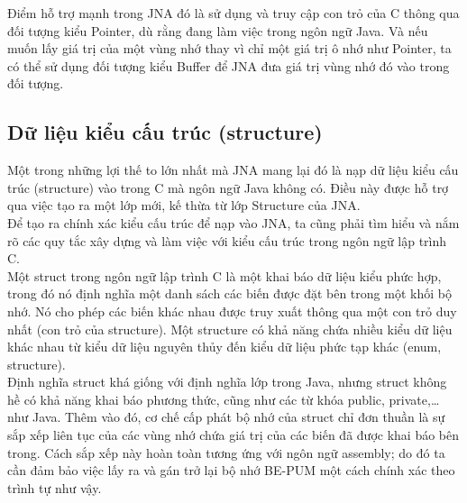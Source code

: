 Điểm hỗ trợ mạnh trong JNA đó là sử dụng và truy cập con trỏ của C thông qua đối tượng kiểu Pointer, dù rằng đang làm việc trong ngôn ngữ Java. Và nếu muốn lấy giá trị của một vùng nhớ thay vì chỉ một giá trị ô nhớ như Pointer, ta có thể sử dụng đối tượng kiểu Buffer để JNA đưa giá trị vùng nhớ đó vào trong đối tượng.


	\subsection{Dữ liệu kiểu cấu trúc (structure)}

Một trong những lợi thế to lớn nhất mà JNA mang lại đó là nạp dữ liệu kiểu cấu trúc (structure) vào trong C mà ngôn ngữ Java không có. Điều này được hỗ trợ qua việc tạo ra một lớp mới, kế thừa từ lớp Structure của JNA.\\

Để tạo ra chính xác kiểu cấu trúc để nạp vào JNA, ta cũng phải tìm hiểu và nắm rõ các quy tắc xây dựng và làm việc với kiểu cấu trúc trong ngôn ngữ lập trình C.\\

Một struct trong ngôn ngữ lập trình C là một khai báo dữ liệu kiểu phức hợp, trong đó nó định nghĩa một danh sách các biến được đặt bên trong một khối bộ nhớ. Nó cho phép các biến khác nhau được truy xuất thông qua một con trỏ duy nhất (con trỏ của structure). Một structure có khả năng chứa nhiều kiểu dữ liệu khác nhau từ kiểu dữ liệu nguyên thủy đến kiểu dữ liệu phức tạp khác (enum, structure).\\

Định nghĩa struct khá giống với định nghĩa lớp trong Java, nhưng struct không hề có khả năng khai báo phương thức, cũng như các từ khóa public, private,… như Java. Thêm vào đó, cơ chế cấp phát bộ nhớ của struct chỉ đơn thuần là sự sắp xếp liên tục của các vùng nhớ chứa giá trị của các biến đã được khai báo bên trong. Cách sắp xếp này hoàn toàn tương ứng với ngôn ngữ assembly; do đó ta cần đảm bảo việc lấy ra và gán trở lại bộ nhớ BE-PUM một cách chính xác theo trình tự như vậy.

